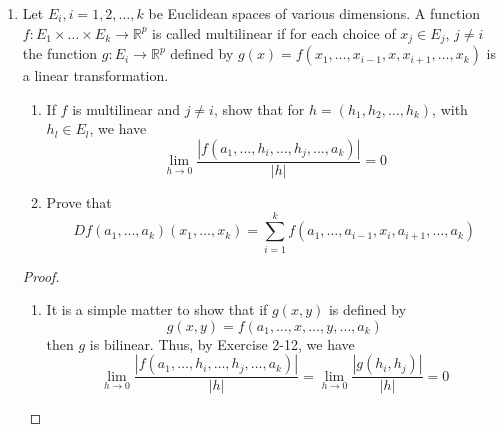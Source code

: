 \begin{enumerate}
\begin{proof}
\begin{enumerate}
        \item Note that \( f(t) = (f_1(t),f_2(t),\ldots,f_n(t)) \) and \( (g_1(t),g_2(t),\ldots,g_n(t)) \). So
        \[
        h(t) = \langle f(t), g(t) \rangle = \sum_{i=1}^n f_i(t)g_i(t)
        \]
        which implies
        \[
        h'(a) = \sum_{i=1}^n (f_i\cdot g_i)'(a) = \sum_{i=1}^n \left[ g_i(a) \right] (f_i)'(a) + \left[ f_i(a) \right] (g_i)'(a)
        \]
        and so, considering \( [f'(a)]^T \) and \( [g'(a)]^T \) as elements of \( \mathbb{R}^n \), then we get
        \[
        h'(a) = \langle f'(a)^T, g(a) \rangle + \langle f(a), g'(a)^T \rangle
        \]
        
        \item Notice that \(  \left| f(t) \right| = 1 \) for all \( t \) implies that \( \langle f(t) , f(t) \rangle = 1 \) for all \( t \). Then if \( g(t) = \langle f(t), f(t) \rangle \), by Theorem 2-3 and (b) from this exercise, we get that for all \( a \) 
        \[
        0 = g'(a) = \langle f'(a)^T, f(a) \rangle + \langle f(a), f'(a)^T \rangle = 2\langle f'(a), f(a) \rangle 
        \]
        which implies that \( \langle f'(t)^T,f(t) \rangle = 0 \).
        
        \item \( f(x) = x^3 \) is such a function.
    \end{enumerate}
    \end{proof}


    \item Let \( E_i, i =1,2,\ldots,k \) be Euclidean spaces of various dimensions. A function \( f:E_1\times\ldots\times E_k \rightarrow \mathbb{R}^p \) is called multilinear if for each choice of \( x_j \in E_j \), \( j \neq i \) the function \( g:E_i \rightarrow \mathbb{R}^p \) defined by \( g(x) = f(x_1,\ldots, x_{i-1},x,x_{i+1},\ldots,x_k) \) is a linear transformation.
    \begin{enumerate}
        \item If \( f \) is multilinear and \( j \neq i \), show that for \( h = (h_1,h_2,\ldots,h_k) \), with \( h_l \in E_l \), we have
        \[
        \lim_{h \rightarrow 0} \frac{\left| f(a_1,\ldots,h_i,\ldots,h_j,\ldots,a_k) \right|}{\left| h \right|} = 0
        \]
        
        \item Prove that 
        \[
        Df(a_1,\ldots,a_k)(x_1,\ldots,x_k) = \sum_{i=1}^k f(a_1,\ldots,a_{i-1},x_i,a_{i+1},\ldots,a_k)
        \]
    \end{enumerate}
    \begin{proof}
    \begin{enumerate}
        \item It is a simple matter to show that if \( g(x,y) \) is defined by 
        \[
        g(x,y) = f(a_1,\ldots,x,\ldots,y,\ldots,a_k)
        \]
        then \( g \) is bilinear. Thus, by Exercise 2-12, we have
        \[
        \lim_{h \rightarrow 0} \frac{\left| f(a_1,\ldots,h_i,\ldots,h_j,\ldots,a_k) \right|}{\left| h \right|} = \lim_{h \rightarrow 0} \frac{\left| g(h_i,h_j) \right|}{\left| h \right|} = 0
        \]
        

\end{enumerate}
\end{proof}
\end{enumerate}
